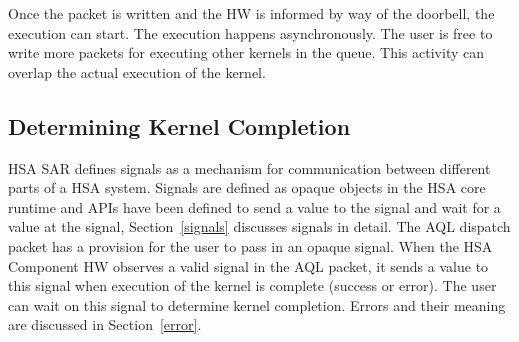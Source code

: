 Once the packet is written and the HW is informed by way of the
doorbell, the execution can start. The execution happens
asynchronously. The user is free to write more packets for executing
other kernels in the queue. This activity can overlap the actual
execution of the kernel.

\subsection{Determining Kernel Completion}
HSA SAR defines signals as a mechanism for communication between
different parts of a HSA system. Signals are defined as opaque
objects in the HSA core runtime and APIs have been defined to send a
value to the signal and wait for a value at the signal,
Section~\ref{signals} discusses signals in detail. The AQL dispatch
packet has a provision for the user to pass in an opaque signal.
When the HSA Component HW observes a valid signal in the AQL packet,
it sends a value to this signal when execution of the kernel is
complete (success or error). The user can wait on this signal to
determine kernel completion. Errors and their
meaning are discussed in Section~\ref{error}.
\begin{framed}

\end{framed}

